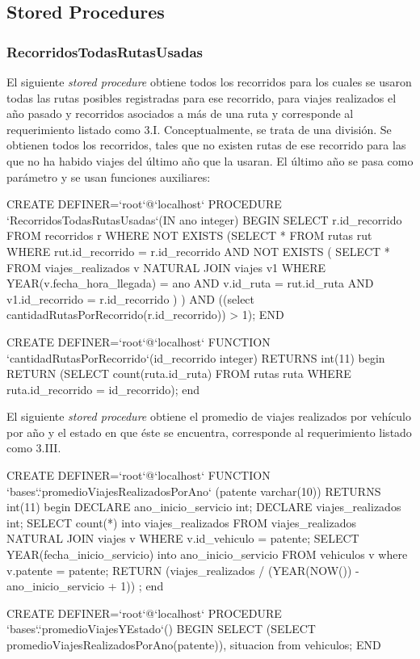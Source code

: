 \subsection{Stored Procedures}

\subsubsection*{RecorridosTodasRutasUsadas}

El siguiente \textit{stored procedure} obtiene todos los recorridos para los cuales se usaron todas las rutas posibles registradas para ese  recorrido, para viajes realizados el año pasado y recorridos asociados a más de una ruta y corresponde al requerimiento listado como 3.I.
Conceptualmente, se trata de una divisi\'on. Se obtienen todos los recorridos, tales que no existen rutas de ese recorrido para las que no ha habido viajes del \'ultimo a\~no que la usaran. El \'ultimo año se pasa como par\'ametro y se usan funciones auxiliares:

\begin{sql}
CREATE DEFINER=`root`@`localhost` PROCEDURE  
	`RecorridosTodasRutasUsadas`(IN ano integer)
BEGIN
		       SELECT r.id_recorrido
	       	       FROM recorridos r
	       	       WHERE NOT EXISTS
			 (SELECT *
			  FROM rutas rut
			  WHERE rut.id_recorrido = r.id_recorrido AND NOT EXISTS (
				SELECT *
				 FROM viajes_realizados v
				 NATURAL JOIN viajes v1
				 WHERE YEAR(v.fecha_hora_llegada) = ano
				       AND v.id_ruta = rut.id_ruta
				       AND v1.id_recorrido = r.id_recorrido
				) 
			 )			
		      AND ((select cantidadRutasPorRecorrido(r.id_recorrido)) > 1);
		END
		
CREATE DEFINER=`root`@`localhost` FUNCTION  
`cantidadRutasPorRecorrido`(id_recorrido integer) RETURNS int(11)
begin
    RETURN (SELECT count(ruta.id_ruta) FROM rutas ruta WHERE ruta.id_recorrido = id_recorrido);
end
\end{sql}

El siguiente \textit{stored procedure} obtiene el promedio de viajes realizados por veh\'iculo por a\~no y el estado en que \'este se encuentra, corresponde al requerimiento listado como 3.III.

\begin{sql}
CREATE DEFINER=`root`@`localhost` FUNCTION  `bases`.`promedioViajesRealizadosPorAno`
								(patente varchar(10)) RETURNS int(11)
begin
    DECLARE ano_inicio_servicio int;
    DECLARE viajes_realizados int;
    SELECT count(*) into viajes_realizados FROM viajes_realizados 
    		NATURAL JOIN viajes v WHERE  v.id_vehiculo = patente;
    SELECT YEAR(fecha_inicio_servicio)  into ano_inicio_servicio 
    		FROM vehiculos v where v.patente = patente;
    RETURN (viajes_realizados / (YEAR(NOW()) - ano_inicio_servicio + 1)) ;
end

CREATE DEFINER=`root`@`localhost` PROCEDURE  `bases`.`promedioViajesYEstado`()
BEGIN
		SELECT (SELECT promedioViajesRealizadosPorAno(patente)), situacion from vehiculos;
		END
		
		
\end{sql}

